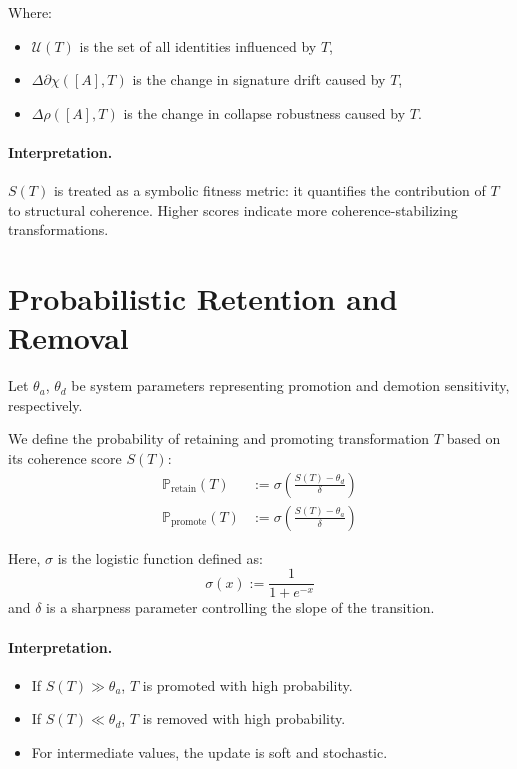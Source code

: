 Where:
\begin{itemize}
    \item $\mathcal{U}(T)$ is the set of all identities influenced by $T$,
    \item $\Delta\partial\chi([A], T)$ is the change in signature drift caused by $T$,
    \item $\Delta\rho([A], T)$ is the change in collapse robustness caused by $T$.
\end{itemize}

\paragraph{Interpretation.}
$S(T)$ is treated as a symbolic fitness metric: it quantifies the contribution of $T$ to structural coherence. Higher scores indicate more coherence-stabilizing transformations.

\section{Probabilistic Retention and Removal} \label{probabilistic-retention-and-removal}

Let $\theta_a$, $\theta_d$ be system parameters representing promotion and demotion sensitivity, respectively.

\begin{definition}
We define the probability of retaining and promoting transformation $T$ based on its coherence score $S(T)$:
\begin{align}
\mathbb{P}_{\text{retain}}(T)  &:= \sigma\left(\frac{S(T) - \theta_d}{\delta}\right) \label{eq:retain-probability} \\
\mathbb{P}_{\text{promote}}(T) &:= \sigma\left(\frac{S(T) - \theta_a}{\delta}\right) \label{eq:promote-probability}
\end{align}
\end{definition}

Here, $\sigma$ is the logistic function defined as:
\begin{equation} \label{eq:logistic-function}
\sigma(x) := \frac{1}{1 + e^{-x}}
\end{equation}
and $\delta$ is a sharpness parameter controlling the slope of the transition.

\paragraph{Interpretation.}
\begin{itemize}
    \item If $S(T) \gg \theta_a$, $T$ is promoted with high probability.
    \item If $S(T) \ll \theta_d$, $T$ is removed with high probability.
    \item For intermediate values, the update is soft and stochastic.
\end{itemize}

